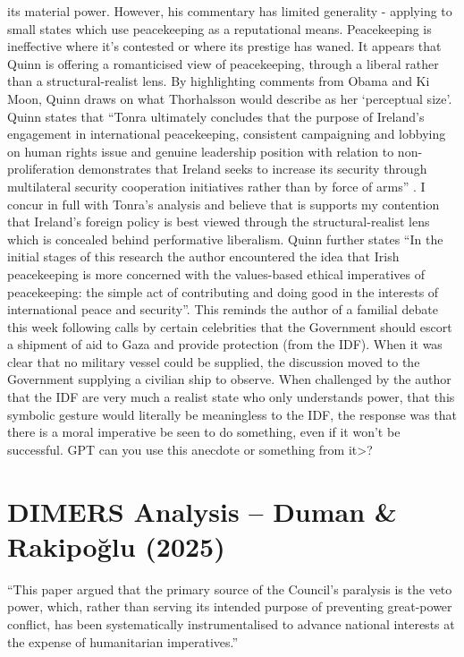 its material power. However, his commentary has limited generality - applying to small states which use peacekeeping as a reputational means. Peacekeeping is ineffective where it's contested or where its prestige has waned. It appears that Quinn is offering a romanticised view of peacekeeping, through a liberal rather than a structural-realist lens. By highlighting comments from Obama and Ki Moon, Quinn draws on what Thorhalsson would describe as her `perceptual size'. Quinn states that ``Tonra ultimately concludes that the purpose of Ireland’s engagement in international  peacekeeping, consistent campaigning and lobbying on human rights issue and genuine  leadership position with relation to non-proliferation demonstrates that Ireland seeks to 
increase its security through multilateral security cooperation initiatives rather than by force of  arms'' \parencite{TONRA_2007}.  I concur in full with Tonra's analysis and believe that is supports my contention that Ireland's foreign policy is best viewed through the structural-realist lens which is concealed behind performative liberalism. Quinn further states ``In the initial stages of this research the  author encountered the idea that Irish peacekeeping is more concerned with the values-based 
ethical imperatives of peacekeeping: the simple act of contributing and doing good in the  interests of international peace and security''. This reminds the author of a familial debate this week following calls by certain celebrities that the Government should escort a shipment of aid to Gaza and provide protection (from the IDF). When it was clear that no military vessel could be supplied, the discussion moved to the Government supplying a civilian ship to observe. When challenged by the author that the IDF are very much a realist state who only understands power, that this symbolic gesture would literally be meaningless to the IDF, the response was that there is a moral imperative be seen to do something, even if it won't be successful. GPT can you use this anecdote or something from it>?

\section*{DIMERS Analysis – Duman \& Rakipoğlu (2025)}

``This paper argued that the primary source of the Council’s paralysis is the veto power, which, rather than serving its intended purpose of preventing great-power conflict, has been  systematically instrumentalised to advance national interests at the expense  of humanitarian imperatives.'' 

